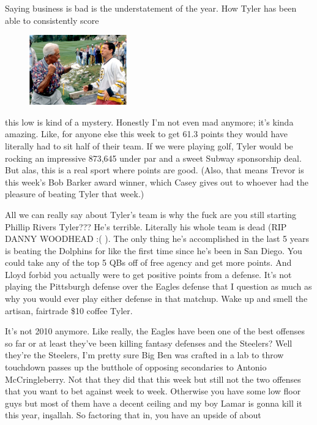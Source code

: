 \documentclass[11pt,letterpaper]{article}
\begin{document}
\par\noindent Saying business is bad is the understatement of the year. How Tyler has been able to consistently score 
\begin{figure}
\centering
\includegraphics[width=0.375\textwidth]{week3-barker.png}
\label{fig:week3-barker}
\end{figure} 
\par\noindent this low is kind of a mystery. Honestly I'm not even mad anymore; it's kinda amazing. Like, for anyone else this week to get 61.3 points they would have literally had to sit half of their team. If we were playing golf, Tyler would be rocking an impressive 873,645 under par and a sweet Subway sponsorship deal. But alas, this is a real sport where points are good. (Also, that means Trevor is this week's Bob Barker award winner, which Casey gives out to whoever had the pleasure of beating Tyler that week.)
\bigskip
\par\noindent All we can really say about Tyler's team is why the fuck are you still starting Phillip Rivers Tyler??? He's terrible. Literally his whole team is dead (RIP DANNY WOODHEAD :( ). The only thing he's accomplished in the last 5 years is beating the Dolphins for like the first time since he's been in San Diego. You could take any of the top 5 QBs off of free agency and get more points. And Lloyd forbid you actually were to get positive points from a defense. It's not playing the Pittsburgh defense over the Eagles defense that I question as much as why you would ever play either defense in that matchup. Wake up and smell the artisan, fairtrade \$10 coffee Tyler. 
\bigskip
\par\noindent It's not 2010 anymore. Like really, the Eagles have been one of the best offenses so far or at least they've been killing fantasy defenses and the Steelers? Well they're the Steelers, I'm pretty sure Big Ben was crafted in a lab to throw touchdown passes up the butthole of opposing secondaries to Antonio McCringleberry. Not that they did that this week but still not the two offenses that you want to bet against week to week. Otherwise you have some low floor guys but most of them have a decent ceiling and my boy Lamar is gonna kill it this year, in\c{s}allah. So factoring that in, you have an upside of about 
\end{document}
